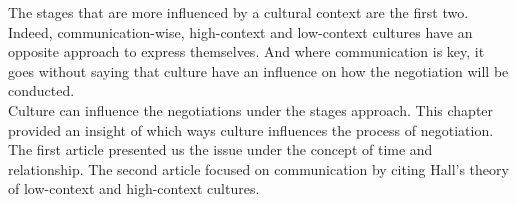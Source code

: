 \documentclass[../main.tex]{subfiles}
\begin{document}
The stages that are more influenced by a cultural context are the first two. Indeed, communication-wise, high-context and low-context cultures have an opposite approach to express themselves. And where communication is key, it goes without saying that culture have an influence on how the negotiation will be conducted.\\

Culture can influence the negotiations under the stages approach. This chapter provided an insight of which ways culture influences the process of negotiation. The first article presented us the issue under the concept of time and relationship. The second article focused on communication by citing Hall's theory of low-context and high-context cultures.
\end{document}
